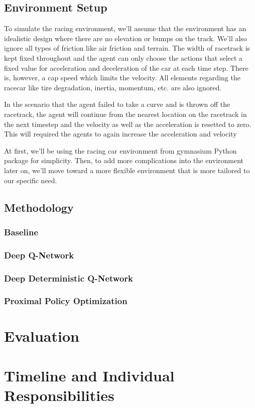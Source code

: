 \documentclass{article}
\begin{document}
\subsection{Environment Setup}
To simulate the racing environment, we'll assume that the environment has an
idealistic design where there are no elevation or bumps on the track. We'll also
ignore all types of friction like air friction and terrain. 
The width of racetrack is kept fixed throughout and the agent can only choose
the actions that select a fixed value for acceleration and deceleration of the
car at each time step. There is,
however, a cap speed which limits the velocity.
All elements regarding the racecar like tire degradation, inertia, momentum,
etc. are also ignored. 

In the scenario that the agent failed to take a curve and is thrown off the
racetrack, the agent will continue from the nearest location on the racetrack in
the next timestep and the velocity as well as the acceleration is resetted to
zero. This will required the agents to again increase the acceleration and
velocity 

At first, we'll be using the racing car
environment from gymnasium Python package for simplicity. Then, to add more
complications into the environment later on, we'll move toward a more flexible
environment that is more tailored to our specific need.
\subsection{Methodology}
\subsubsection{Baseline}
\subsubsection{Deep Q-Network}
\subsubsection{Deep Deterministic Q-Network}
\subsubsection{Proximal Policy Optimization}
\section{Evaluation}
\section{Timeline and Individual Responsibilities}



\end{document}
